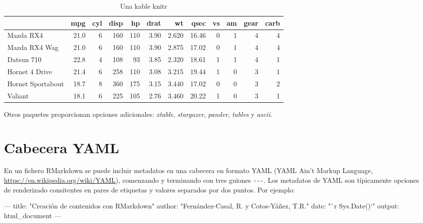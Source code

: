 \documentclass[]{book}
\newenvironment{Shaded}{\begin{snugshade}}{\end{snugshade}}
\newcommand{\StringTok}[1]{\textcolor[rgb]{0.31,0.60,0.02}{#1}}
\newcommand{\OtherTok}[1]{\textcolor[rgb]{0.56,0.35,0.01}{#1}}
\newcommand{\FunctionTok}[1]{\textcolor[rgb]{0.00,0.00,0.00}{#1}}
\newcommand{\AttributeTok}[1]{\textcolor[rgb]{0.77,0.63,0.00}{#1}}
\theoremstyle{definition}
\theoremstyle{definition}
\theoremstyle{definition}
\theoremstyle{remark}
\begin{document}
\begin{table}[t]

\caption{\label{tab:kable}Una kable knitr}
\centering
\begin{tabular}{l|r|r|r|r|r|r|r|r|r|r|r}
\hline
  & mpg & cyl & disp & hp & drat & wt & qsec & vs & am & gear & carb\\
\hline
Mazda RX4 & 21.0 & 6 & 160 & 110 & 3.90 & 2.620 & 16.46 & 0 & 1 & 4 & 4\\
\hline
Mazda RX4 Wag & 21.0 & 6 & 160 & 110 & 3.90 & 2.875 & 17.02 & 0 & 1 & 4 & 4\\
\hline
Datsun 710 & 22.8 & 4 & 108 & 93 & 3.85 & 2.320 & 18.61 & 1 & 1 & 4 & 1\\
\hline
Hornet 4 Drive & 21.4 & 6 & 258 & 110 & 3.08 & 3.215 & 19.44 & 1 & 0 & 3 & 1\\
\hline
Hornet Sportabout & 18.7 & 8 & 360 & 175 & 3.15 & 3.440 & 17.02 & 0 & 0 & 3 & 2\\
\hline
Valiant & 18.1 & 6 & 225 & 105 & 2.76 & 3.460 & 20.22 & 1 & 0 & 3 & 1\\
\hline
\end{tabular}
\end{table}

Otros paquetes proporcionan opciones adicionales: \emph{xtable},
\emph{stargazer}, \emph{pander}, \emph{tables} y \emph{ascii}.

\section{Cabecera YAML}\label{yaml}

En un fichero RMarkdown se puede incluir metadatos en una cabecera en
formato YAML (YAML Ain't Markup Language,
\url{https://en.wikipedia.org/wiki/YAML}), comenzando y terminando con
tres guiones \texttt{-\/-\/-}. Los metadatos de YAML son típicamente
opciones de renderizado consitentes en pares de etiquetas y valores
separados por dos puntos. Por ejemplo:

\begin{Shaded}
\begin{Highlighting}[]
\OtherTok{---}
\FunctionTok{title:}\AttributeTok{ }\StringTok{"Creación de contenidos con RMarkdown"}
\FunctionTok{author:}\AttributeTok{ }\StringTok{"Fernández-Casal, R. y Cotos-Yáñez, T.R."}
\FunctionTok{date:}\AttributeTok{ }\StringTok{"`r Sys.Date()`"}
\FunctionTok{output:}\AttributeTok{ html_document}
\OtherTok{---}
\end{Highlighting}
\end{Shaded}
\end{document}
